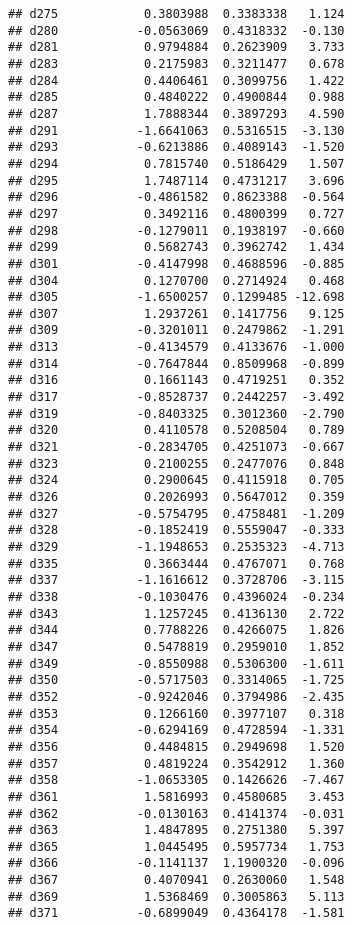 \documentclass[
]{article}
\begin{document}
\begin{verbatim}
## d275            0.3803988  0.3383338   1.124
## d280           -0.0563069  0.4318332  -0.130
## d281            0.9794884  0.2623909   3.733
## d283            0.2175983  0.3211477   0.678
## d284            0.4406461  0.3099756   1.422
## d285            0.4840222  0.4900844   0.988
## d287            1.7888344  0.3897293   4.590
## d291           -1.6641063  0.5316515  -3.130
## d293           -0.6213886  0.4089143  -1.520
## d294            0.7815740  0.5186429   1.507
## d295            1.7487114  0.4731217   3.696
## d296           -0.4861582  0.8623388  -0.564
## d297            0.3492116  0.4800399   0.727
## d298           -0.1279011  0.1938197  -0.660
## d299            0.5682743  0.3962742   1.434
## d301           -0.4147998  0.4688596  -0.885
## d304            0.1270700  0.2714924   0.468
## d305           -1.6500257  0.1299485 -12.698
## d307            1.2937261  0.1417756   9.125
## d309           -0.3201011  0.2479862  -1.291
## d313           -0.4134579  0.4133676  -1.000
## d314           -0.7647844  0.8509968  -0.899
## d316            0.1661143  0.4719251   0.352
## d317           -0.8528737  0.2442257  -3.492
## d319           -0.8403325  0.3012360  -2.790
## d320            0.4110578  0.5208504   0.789
## d321           -0.2834705  0.4251073  -0.667
## d323            0.2100255  0.2477076   0.848
## d324            0.2900645  0.4115918   0.705
## d326            0.2026993  0.5647012   0.359
## d327           -0.5754795  0.4758481  -1.209
## d328           -0.1852419  0.5559047  -0.333
## d329           -1.1948653  0.2535323  -4.713
## d335            0.3663444  0.4767071   0.768
## d337           -1.1616612  0.3728706  -3.115
## d338           -0.1030476  0.4396024  -0.234
## d343            1.1257245  0.4136130   2.722
## d344            0.7788226  0.4266075   1.826
## d347            0.5478819  0.2959010   1.852
## d349           -0.8550988  0.5306300  -1.611
## d350           -0.5717503  0.3314065  -1.725
## d352           -0.9242046  0.3794986  -2.435
## d353            0.1266160  0.3977107   0.318
## d354           -0.6294169  0.4728594  -1.331
## d356            0.4484815  0.2949698   1.520
## d357            0.4819224  0.3542912   1.360
## d358           -1.0653305  0.1426626  -7.467
## d361            1.5816993  0.4580685   3.453
## d362           -0.0130163  0.4141374  -0.031
## d363            1.4847895  0.2751380   5.397
## d365            1.0445495  0.5957734   1.753
## d366           -0.1141137  1.1900320  -0.096
## d367            0.4070941  0.2630060   1.548
## d369            1.5368469  0.3005863   5.113
## d371           -0.6899049  0.4364178  -1.581

\end{verbatim}
\end{document}
